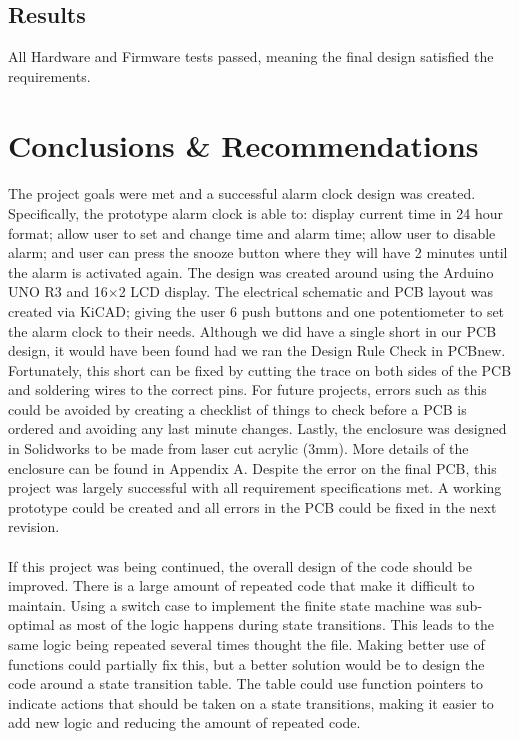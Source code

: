 \documentclass{article}
\begin{document}
\subsection{Results}
All Hardware and Firmware tests passed, meaning the final design satisfied the requirements.

\section{Conclusions \& Recommendations} %
\paragraph{}
The project goals were met and a successful alarm clock design was created. Specifically, the prototype alarm clock is able to: display current time in 24 hour format; allow user to set and change time and alarm time; allow user to disable alarm; and user can press the snooze button where they will have 2 minutes until the alarm is activated again. The design was created around using the Arduino UNO R3 and 16$\times$2 LCD display. The electrical schematic and PCB layout was created via KiCAD; giving the user 6 push buttons and one potentiometer to set the alarm clock to their needs. Although we did have a single short in our PCB design, it would have been found had we ran the Design Rule Check in PCBnew. Fortunately, this short can be fixed by cutting the trace on both sides of the PCB and soldering wires to the correct pins. For future projects, errors such as this could be avoided by creating a checklist of things to check before a PCB is ordered and avoiding any last minute changes. Lastly, the enclosure was designed in Solidworks to be made from laser cut acrylic (3mm). More details of the enclosure can be found in Appendix A. Despite the error on the final PCB, this project was largely successful with all requirement specifications met. A working prototype could be created and all errors in the PCB could be fixed in the next revision.

\paragraph{}
If this project was being continued, the overall design of the code should be improved. There is a large amount of repeated code that make it difficult to maintain. Using a switch case to implement the finite state machine was sub-optimal as most of the logic happens during state transitions. This leads to the same logic being repeated several times thought the file. Making better use of functions could partially fix this, but a better solution would be to design the code around a state transition table. The table could use function pointers to indicate actions that should be taken on a state transitions, making it easier to add new logic and reducing the  amount of repeated code.
\end{document}
